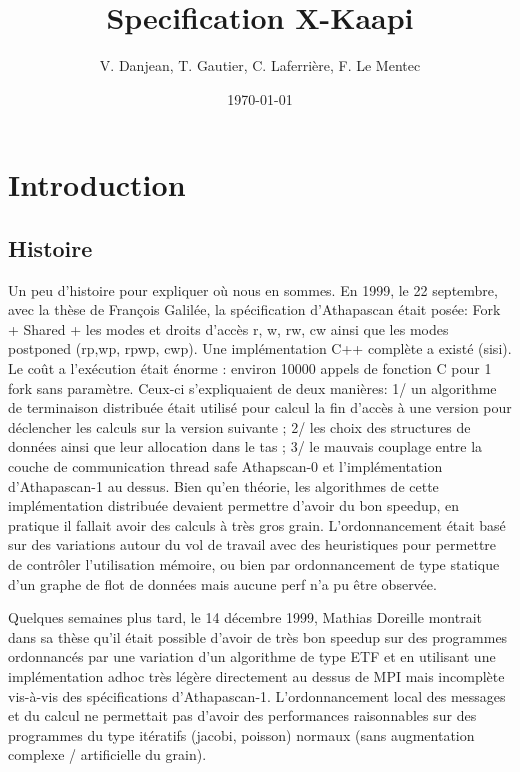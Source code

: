 \documentclass[12pt]{report}
\begin{document}
\title{Specification X-Kaapi}
\author{V. Danjean, T. Gautier, C. Laferrière, F. Le Mentec}
\date{\today}
\maketitle

\newpage
\chapter{Introduction}


\section{Histoire}
Un peu d'histoire pour expliquer où nous en sommes.
En 1999, le 22 septembre, avec la thèse de François Galilée, la spécification d'Athapascan était posée: Fork + Shared + les modes et droits d'accès r, w, rw, cw ainsi que les modes postponed (rp,wp, rpwp, cwp). Une implémentation C++ complète a existé (sisi). Le coût a l'exécution était énorme : environ 10000 appels de fonction C pour 1 fork sans paramètre. Ceux-ci s'expliquaient de deux manières: 1/ un algorithme de terminaison distribuée était utilisé pour calcul la fin d'accès à une version pour déclencher les calculs sur la version suivante ; 2/ les choix des structures de données ainsi que leur allocation dans le tas ; 3/ le mauvais couplage entre la couche de communication thread safe Athapscan-0 et l'implémentation d'Athapascan-1 au dessus. Bien qu'en théorie, les algorithmes de cette implémentation distribuée devaient permettre d'avoir du bon speedup, en pratique il fallait avoir des calculs à très gros grain. L'ordonnancement était basé sur des variations autour du vol de travail avec des heuristiques pour permettre de contrôler l'utilisation mémoire, ou bien par ordonnancement de type statique d'un graphe de flot de données mais aucune perf n'a pu être observée.

Quelques semaines plus tard, le 14 décembre 1999, Mathias Doreille montrait dans sa thèse qu'il était possible d'avoir de très bon speedup sur des programmes ordonnancés par une variation d'un algorithme de type ETF et en utilisant une implémentation adhoc très légère directement au dessus de MPI mais incomplète vis-à-vis des spécifications d'Athapascan-1. L'ordonnancement local des messages et du calcul ne permettait pas d'avoir des performances raisonnables sur des programmes du type itératifs (jacobi, poisson) normaux (sans augmentation complexe / artificielle du grain).
\end{document}
